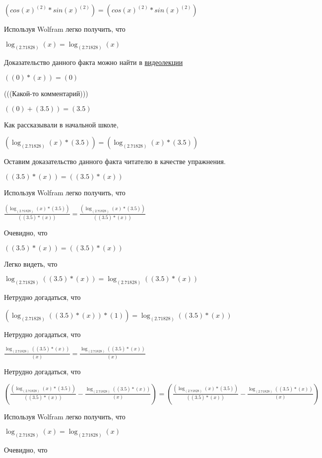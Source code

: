 \documentclass[12pt,a4paper,fleqn]{article}
\theoremstyle{definition}
\begin{document}
$(cos{( x )}^{( 2 )} * sin{( x )}^{( 2 )}) = (cos{( x )}^{( 2 )} * sin{( x )}^{( 2 )})$

Используя Wolfram легко получить, что

$\log_{( 2.71828 )}{( x )} = \log_{( 2.71828 )}{( x )}$

Доказательство данного факта можно найти в \href{https://www.youtube.com/watch?v=dQw4w9WgXcQ}{видеолекции}

$(( 0 ) * ( x )) = ( 0 )$

(((Какой-то комментарий)))

$(( 0 ) + ( 3.5 )) = ( 3.5 )$

Как рассказывали в начальной школе,

$(\log_{( 2.71828 )}{( x )} * ( 3.5 )) = (\log_{( 2.71828 )}{( x )} * ( 3.5 ))$

Оставим доказательство данного факта читателю в качестве упражнения.

$(( 3.5 ) * ( x )) = (( 3.5 ) * ( x ))$

Используя Wolfram легко получить, что

$\frac{(\log_{( 2.71828 )}{( x )} * ( 3.5 ))}{(( 3.5 ) * ( x ))}
 = \frac{(\log_{( 2.71828 )}{( x )} * ( 3.5 ))}{(( 3.5 ) * ( x ))}
$

Очевидно, что

$(( 3.5 ) * ( x )) = (( 3.5 ) * ( x ))$

Легко видеть, что

$\log_{( 2.71828 )}{(( 3.5 ) * ( x ))} = \log_{( 2.71828 )}{(( 3.5 ) * ( x ))}$

Нетрудно догадаться, что

$(\log_{( 2.71828 )}{(( 3.5 ) * ( x ))} * ( 1 )) = \log_{( 2.71828 )}{(( 3.5 ) * ( x ))}$

Нетрудно догадаться, что

$\frac{\log_{( 2.71828 )}{(( 3.5 ) * ( x ))}}{( x )}
 = \frac{\log_{( 2.71828 )}{(( 3.5 ) * ( x ))}}{( x )}
$

Нетрудно догадаться, что

$(\frac{(\log_{( 2.71828 )}{( x )} * ( 3.5 ))}{(( 3.5 ) * ( x ))}
 - \frac{\log_{( 2.71828 )}{(( 3.5 ) * ( x ))}}{( x )}
) = (\frac{(\log_{( 2.71828 )}{( x )} * ( 3.5 ))}{(( 3.5 ) * ( x ))}
 - \frac{\log_{( 2.71828 )}{(( 3.5 ) * ( x ))}}{( x )}
)$

Используя Wolfram легко получить, что

$\log_{( 2.71828 )}{( x )} = \log_{( 2.71828 )}{( x )}$

Очевидно, что
\end{document}
